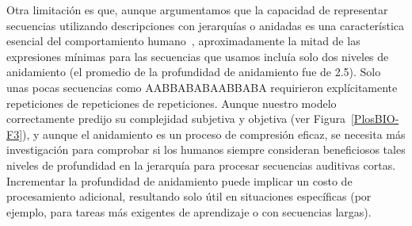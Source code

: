 
Otra limitación es que, aunque argumentamos que la capacidad de representar secuencias utilizando descripciones con jerarquías o anidadas es una característica esencial del comportamiento humano~\cite{f4}, aproximadamente la mitad de las expresiones mínimas para las secuencias que usamos incluía solo dos niveles de anidamiento (el promedio de la profundidad de anidamiento fue de 2.5). Solo unas pocas secuencias como AABBABABAABBABA requirieron explícitamente repeticiones de repeticiones de repeticiones. Aunque nuestro modelo correctamente predijo su complejidad subjetiva y objetiva (ver Figura~\ref{PlosBIO-F3}), y aunque el anidamiento es un proceso de compresión eficaz, se necesita más investigación para comprobar si los humanos siempre consideran beneficiosos tales niveles de profundidad en la jerarquía para procesar secuencias auditivas cortas. Incrementar la profundidad de anidamiento puede implicar un costo de procesamiento adicional, resultando solo útil en situaciones específicas (por ejemplo, para tareas más exigentes de aprendizaje o con secuencias largas).

